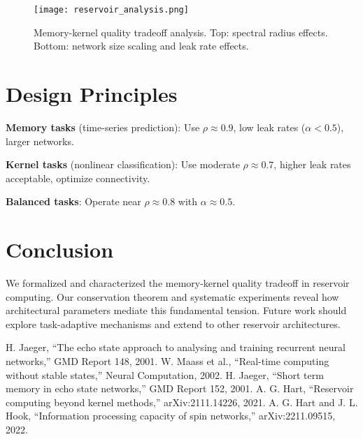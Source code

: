 \documentclass[11pt]{article}
\begin{document}
\begin{figure}[t]
\centering
\texttt{[image: reservoir\_analysis.png]}
\caption{Memory-kernel quality tradeoff analysis. Top: spectral radius effects. Bottom: network size scaling and leak rate effects.}
\label{fig:main}
\end{figure}

\section{Design Principles}

\textbf{Memory tasks} (time-series prediction): Use $\rho \approx 0.9$, low leak rates ($\alpha < 0.5$), larger networks.

\textbf{Kernel tasks} (nonlinear classification): Use moderate $\rho \approx 0.7$, higher leak rates acceptable, optimize connectivity.

\textbf{Balanced tasks}: Operate near $\rho \approx 0.8$ with $\alpha \approx 0.5$.

\section{Conclusion}

We formalized and characterized the memory-kernel quality tradeoff in reservoir computing. Our conservation theorem and systematic experiments reveal how architectural parameters mediate this fundamental tension. Future work should explore task-adaptive mechanisms and extend to other reservoir architectures.

\begin{thebibliography}{9}
 H. Jaeger, ``The echo state approach to analysing and training recurrent neural networks,'' GMD Report 148, 2001.
 W. Maass et al., ``Real-time computing without stable states,'' Neural Computation, 2002.
 H. Jaeger, ``Short term memory in echo state networks,'' GMD Report 152, 2001.
 A. G. Hart, ``Reservoir computing beyond kernel methods,'' arXiv:2111.14226, 2021.
 A. G. Hart and J. L. Hook, ``Information processing capacity of spin networks,'' arXiv:2211.09515, 2022.
\end{thebibliography}
\end{document}
